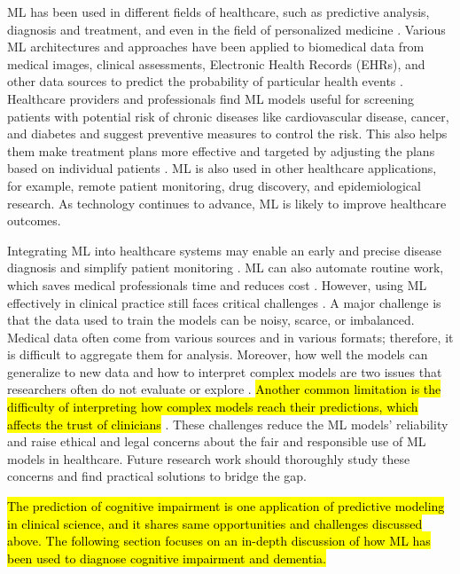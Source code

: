 ML has been used in different fields of healthcare, such as predictive analysis, diagnosis and treatment, and even in the field of personalized medicine \cite{Bajwa2021Artificial, An2023Comprehensive}. Various ML architectures and approaches have been applied to biomedical data from medical images, clinical assessments, Electronic Health Records (EHRs), and other data sources to predict the probability of particular health events \cite{An2023Comprehensive, Binson2024Review}. Healthcare providers and professionals find ML models useful for screening patients with potential risk of chronic diseases like cardiovascular disease, cancer, and diabetes and suggest preventive measures to control the risk. This also helps them make treatment plans more effective and targeted by adjusting the plans based on individual patients \cite{Bajwa2021Artificial}. ML is also used in other healthcare applications, for example, remote patient monitoring, drug discovery, and epidemiological research. As technology continues to advance, ML is likely to improve healthcare outcomes.

Integrating ML into healthcare systems may enable an early and precise disease diagnosis and simplify patient monitoring \cite{Habehh2021Machine}. ML can also automate routine work, which saves medical professionals time and reduces cost \cite{Bajwa2021Artificial}. However, using ML effectively in clinical practice still faces critical challenges \cite{Binson2024Review}. A major challenge is that the data used to train the models can be noisy, scarce, or imbalanced. Medical data often come from various sources and in various formats; therefore, it is difficult to aggregate them for analysis. Moreover, how well the models can generalize to new data and how to interpret complex models are two issues that researchers often do not evaluate or explore \cite{Vermeulen2025Limited}. \hl{Another common limitation is the difficulty of interpreting how complex models reach their predictions, which affects the trust of clinicians} \cite{Martin2023Interpretable}. These challenges reduce the ML models' reliability and raise ethical and legal concerns about the fair and responsible use of ML models in healthcare. Future research work should thoroughly study these concerns and find practical solutions to bridge the gap.

\hl{The prediction of cognitive impairment is one application of predictive modeling in clinical science, and it shares same opportunities and challenges discussed above. The following section focuses on an in-depth discussion of how ML has been used to diagnose cognitive impairment and dementia.}

